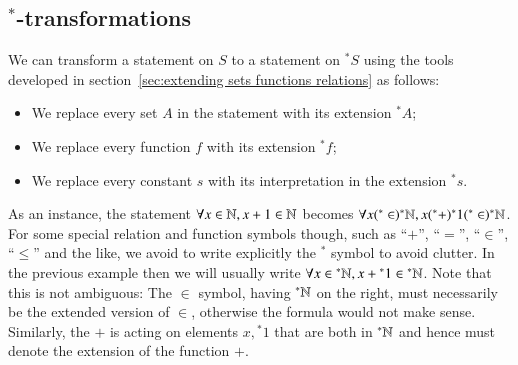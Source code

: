 \documentclass[adraft, copyright,creativecommons,sharealike,noncommercial]{Preambles/eptcs}
\newcommand{\nstar}{{^*}}
\begin{document}
\subsection{$\nstar$-transformations}
%
We can transform a statement on $S$ to a statement on $\nstar S$ using the tools developed in section~\ref{sec:extending sets functions relations} as follows:
\begin{itemize}
	\item We replace every set $A$ in the statement with its extension $\nstar A$;
	\item We replace every function $f$ with its extension $\nstar f$;
	\item We replace every constant $s$ with its interpretation in the extension $\nstar s$.
\end{itemize}
%
As an instance, the statement $\forall x \in \mathbb{N}, x+1 \in \mathbb{N}$ becomes $\forall x (\nstar\in) \nstar \naturals, x(\nstar+)\nstar 1 (\nstar \in )\nstar \naturals$. For some special relation and function symbols though, such as ``$+$'', ``$=$'', ``$\in$'', ``$\leq$'' and the like, we avoid to write explicitly the $\nstar$ symbol to avoid clutter. In the previous example then we will usually write $\forall x \in \nstar \naturals, x+\nstar 1 \in \nstar \naturals$. Note that this is not ambiguous: The $\in$ symbol, having $\nstar \naturals$ on the right, must necessarily be the extended version of $\in$, otherwise the formula would not make sense. Similarly, the $+$ is acting on elements $x, \nstar 1$ that are both in $\nstar \naturals$ and hence must denote the extension of the function $+$.
\end{document}
